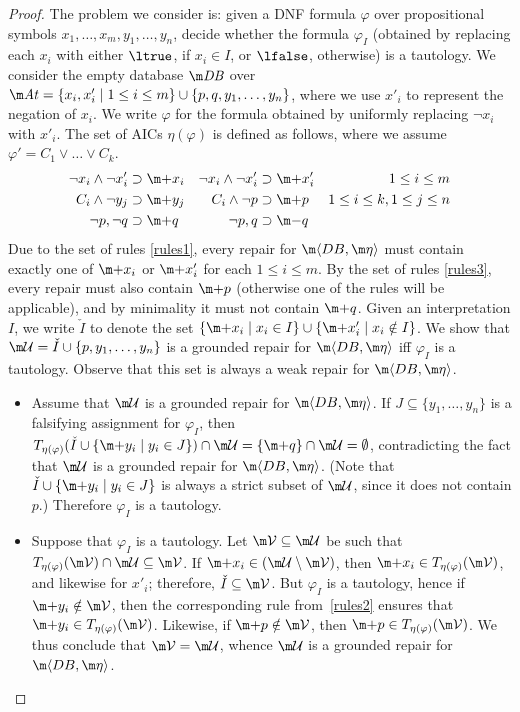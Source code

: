 \begin{proof}
  The problem we consider is: given a DNF formula $\varphi$ over propositional symbols $x_1,\ldots,x_m,y_1,\ldots,y_n$, decide whether the formula $\varphi_I$ (obtained by replacing each $x_i$ with either $\ltrue$, if $x_i\in I$, or $\lfalse$, otherwise) is a tautology.  We consider the empty database $\db$ over $\atoms=\{x_i,x'_i\mid 1\leq i\leq m\}\cup\{p,q,y_1,\ldots,y_n\}$, where we use $x'_i$ to represent the negation of $x_i$.  We write $\varphi$ for the formula obtained by uniformly replacing $\neg x_i$ with $x'_i$.  The set of AICs $\eta(\varphi)$ is defined as follows, where we assume $\varphi'=C_1\lor\ldots\lor C_k$.
  \begin{align}
    \neg x_i\land\neg x'_i &\aicrule \add x_i & \neg x_i\land\neg x'_i &\aicrule \add x'_i & 1\leq i\leq m & \label{rules1} \\
    C_i\land\neg y_j &\aicrule \add y_j & C_i \land \neg p &\aicrule \add p & 1\leq i\leq k, 1\leq j\leq n & \label{rules2} \\
    \neg p,\neg q &\aicrule \add q & \neg p,q &\aicrule \remove q & \label{rules3}
  \end{align}
  Due to the set of rules \ref{rules1}, every repair for $\fulldb$ must contain exactly one of $\add x_i$ or $\add x'_i$ for each $1\leq i\leq m$.
  By the set of rules \ref{rules3}, every repair must also contain $\add p$ (otherwise one of the rules will be applicable), and by minimality it must not contain $\add q$.
  Given an interpretation $I$, we write $\check I$ to denote the set $\{\add x_i\mid x_i\in I\}\cup\{\add x'_i\mid x_i\notin I\}$.
  We show that $\UU=\check I\cup\{p,y_1,\ldots,y_n\}$ is a grounded repair for $\fulldb$ iff $\varphi_I$ is a tautology. Observe that this set is always a weak repair for $\fulldb$.
  \begin{itemize}
  \item Assume that $\UU$ is a grounded repair for $\fulldb$.
    If $J\subseteq\{y_1,\ldots,y_n\}$ is a falsifying assignment for $\varphi_I$, then $T_{\eta(\varphi)}(\check I\cup\{\add y_i\mid y_i\in J\})\cap\UU=\{\add q\}\cap\UU=\emptyset$, contradicting the fact that $\UU$ is a grounded repair for $\fulldb$.
    (Note that $\check I\cup\{\add y_i\mid y_i\in J\}$ is always a strict subset of $\UU$, since it does not contain $p$.)
    Therefore $\varphi_I$ is a tautology.
  \item Suppose that $\varphi_I$ is a tautology.
    Let $\VV\subseteq\UU$ be such that $T_{\eta(\varphi)}(\VV)\cap\UU\subseteq\VV$.
    If $\add x_i\in(\UU\setminus\VV)$, then $\add x_i\in T_{\eta(\varphi)}(\VV)$, and likewise for $x'_i$; therefore, $\check I\subseteq\VV$.
    But $\varphi_I$ is a tautology, hence if $\add y_i\notin\VV$, then the corresponding rule from~\ref{rules2} ensures that $\add y_i\in T_{\eta(\varphi)}(\VV)$. Likewise, if $\add p\notin\VV$, then $\add p\in T_{\eta(\varphi)}(\VV)$.
    We thus conclude that $\VV=\UU$, whence $\UU$ is a grounded repair for $\fulldb$.
  \end{itemize}
\end{proof}


